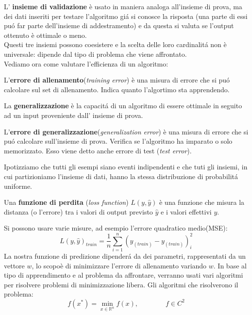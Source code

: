 \documentclass[a4paper,12pt,oneside]{book}
\begin{document}
L' \textbf{insieme di validazione} \`e usato in maniera analoga all'insieme di prova, ma dei dati inseriti per testare l'algoritmo gi\'{a} si conosce la risposta (una parte di essi pu\'{o} far parte dell'insieme di addestramento) e da questa si valuta se l'output ottenuto \`e ottimale o meno.\\
Questi tre insiemi possono coesistere e la scelta delle loro cardinalit\'{a} non \`e universale: dipende dal tipo di problema che viene affrontato.\\
Vediamo ora come valutare l'efficienza di un algoritmo:
\begin{defin}
L'\textbf{errore di allenamento}(\textit{training error}) \`e una misura di errore che si pu\'{o} calcolare sul set di allenamento. Indica quanto l'algortimo sta apprendendo.
\end{defin}
\begin{defin}
La \textbf{generalizzazione} \`e la capacit\'{a} di un algoritmo di essere ottimale in seguito ad un input proveniente dall' insieme di prova.
\end{defin}
\begin{defin}
L'\textbf{errore di generalizzazione}(\textit{generalization error}) \`e una misura di errore che si pu\'{o} calcolare sull'insieme di prova. Verifica se l'algoritmo ha imparato o solo memorizzato.
Esso viene detto anche errore di test (\textit{test error}).
\end{defin}
Ipotizziamo che tutti gli esempi siano eventi indipendenti e che tuti gli insiemi, in cui partizioniamo l'insieme di dati, hanno la stessa distribuzione di probabilit\'{a} uniforme.
\begin{defin}
Una \textbf{funzione di perdita} (\textit{loss function}) $L(y,\hat{y})$ \`e una funzione che misura la distanza (o l'errore) tra i valori di output previsto $\hat{y}$ e i valori effettivi ${y}$.
\end{defin}
Si possono usare varie misure, ad esempio l'errore quadratico medio(MSE):
\begin{equation}\label{train-error}
L(y,\hat{y})_{train}=\frac{1}{n}\sum_{i=1}^{n}(\hat{y}_{(train)}-y_{(train)})_{i}^2
\end{equation}
La nostra funzione di predizione dipender\'{a} da dei parametri, rappresentati da un vettore $w$, lo scopo\`e di minimizzare l'errore di allenamento variando $w$.
In base al tipo di apprendimento e al problema da affrontare, verranno usati vari algoritmi per risolvere problemi di minimizzazione libera. Gli algoritmi che risolverono il problema:
\begin{equation}\label{minimi}
f(x^{*})=\min_{x\in \mathbb{R}^{n}}f(x),\qquad \qquad f\in C^{2}
\end{equation}
\end{document}
